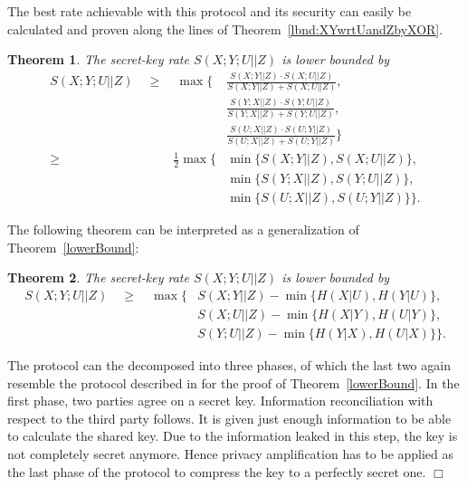 \documentclass[a4paper, twoside, openany]{report}
\newcommand{\half}{\frac{1}{2}}
\theoremstyle{plain}
\newtheorem{theorem}{Theorem}
\theoremstyle{definition}
\newcommand{\proofend}{\hspace*{\fill} $\Box$\\}
\begin{document}
The best rate achievable with this protocol and its security can easily be calculated and proven along the lines of Theorem~\ref{lbnd:XYwrtUandZbyXOR}.

\begin{theorem}
The secret-key rate $S(X;Y;U||Z)$ is lower bounded by
\begin{eqnarray*}
S(X;Y;U||Z) \quad \geq & \ \max\bigg\{\!\!\!\!\!\!\! & \frac{S(X;Y||Z) \cdot S(X;U||Z)}{S(X;Y||Z) + S(X;U||Z)}, \\
                   &                                 & \frac{S(Y;X||Z) \cdot S(Y;U||Z)}{S(Y;X||Z) + S(Y;U||Z)}, \\
                   &                                 & \frac{S(U;X||Z) \cdot S(U;Y||Z)}{S(U;X||Z) + S(U;Y||Z)}\bigg\} \\
              \geq & \half \max\{\!\!\!\!\! & \min\{S(X;Y||Z), S(X;U||Z)\}, \\
                   &                        & \min\{S(Y;X||Z), S(Y;U||Z)\}, \\
                   &                        & \min\{S(U;X||Z), S(U;Y||Z)\}\}.
\end{eqnarray*}
\end{theorem}

\noindent
The following theorem can be interpreted as a generalization of Theorem~\ref{lowerBound}:
\begin{theorem} \label{lbnd:XYUwrtZ}
The secret-key rate $S(X;Y;U||Z)$ is lower bounded by
\begin{eqnarray*}
S(X;Y;U||Z) \quad \geq & \ \max\{\!\!\!\!\! & S(X;Y||Z) - \min\{H(X|U), H(Y|U)\}, \\
                       &                    & S(X;U||Z) - \min\{H(X|Y), H(U|Y)\}, \\
                       &                    & S(Y;U||Z) - \min\{H(Y|X), H(U|X)\}\}.
\end{eqnarray*}
\end{theorem}

\proof
The protocol can the decomposed into three phases, of which the last two again resemble the protocol described in \cite{diss} for the proof of Theorem~\ref{lowerBound}. In the first phase, two parties agree on a secret key. Information reconciliation with respect to the third party follows. It is given just enough information to be able to calculate the shared key. Due to the information leaked in this step, the key is not completely secret anymore. Hence privacy amplification has to be applied as the last phase of the protocol to compress the key to a perfectly secret one.
\proofend
\end{document}
